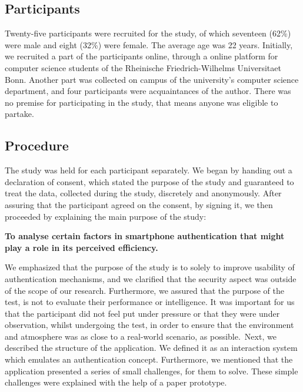 \subsection{Participants}

Twenty-five participants were recruited for the study, of which seventeen (62\%) were male and eight (32\%) were female. The average age was 22 years. Initially, we recruited a part of the participants online, through a online platform for computer science students of the Rheinische Friedrich-Wilhelms Universitaet Bonn. Another part was collected on campus of the university's computer science department, and four participants were acquaintances of the author. There was no premise for participating in the study, that means anyone was eligible to partake.



\subsection{Procedure}
The study was held for each participant separately. We began by handing out a declaration of consent, which stated the purpose of the study and guaranteed to treat the data, collected during the study, discretely and anonymously. After assuring that the participant agreed on the consent, by signing it, we then proceeded by explaining the main purpose of the study:\par

\textbf{To analyse certain factors in smartphone authentication that might play a role in its perceived efficiency.}\par

We emphasized that the purpose of the study is to solely to improve usability of authentication mechanisms, and we clarified that the security aspect was outside of the scope of our research. Furthermore, we assured that the purpose of the test, is not to evaluate their performance or intelligence. It was important for us that the participant did not feel put under pressure or that they were under observation, whilst undergoing the test, in order to ensure that the environment and atmosphere was as close to a real-world scenario, as possible.\
Next, we described the structure of the application. We defined it as an interaction system which emulates an authentication concept. Furthermore, we mentioned that the application presented a series of small challenges, for them to solve. These simple challenges were explained with the help of a paper prototype.\\

